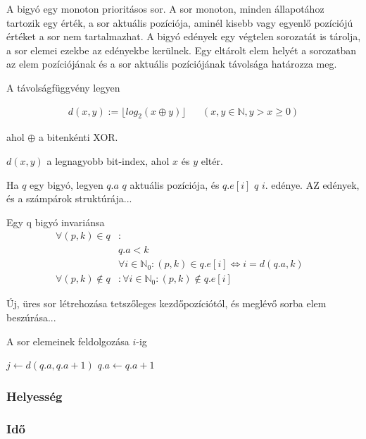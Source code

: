 A bigyó egy monoton prioritásos sor.
A sor monoton, minden állapotához tartozik egy érték, a sor aktuális pozíciója,
aminél kisebb vagy egyenlő pozíciójú értéket a sor nem tartalmazhat.
A bigyó edények egy végtelen sorozatát is tárolja, a sor elemei ezekbe az edényekbe kerülnek.
Egy eltárolt elem helyét a sorozatban az elem pozíciójának
és a sor aktuális pozíciójának távolsága határozza meg.

A távolságfüggvény legyen

\begin{align*}
d(x, y) := \lfloor log_{2}{}(x \oplus y) \rfloor & & (x, y \in \mathbb{N}, y > x \ge 0)
\end{align*}

ahol $\oplus$ a bitenkénti XOR.

$d(x, y)$ a legnagyobb bit-index, ahol $x$ és $y$ eltér.

Ha $q$ egy bigyó, legyen $q.a$ $q$ aktuális pozíciója, és $q.e[i]$ $q$ $i$. edénye. AZ edények, és a számpárok struktúrája...

Egy q bigyó invariánsa
\begin{align*}
\forall (p, k) \in q &: &\\ 
	& q.a < k\\
	& \forall i \in \mathbb{N}_{0}: (p, k) \in q.e[i] \iff i=d(q.a, k) \\
\forall (p, k) \not\in q &: \forall i \in \mathbb{N}_{0}: (p, k) \not\in q.e[i]
\end{align*}

Új, üres sor létrehozása tetszőleges kezdőpozíciótól, és meglévő sorba elem beszúrása...

A sor elemeinek feldolgozása $i$-ig
\begin{algorithmic}[1]
	\State $j \gets d(q.a, q.a + 1)$
	\State $q.a \gets q.a + 1$
		\State {}
			\State {}
		\Else
			\State {}
		\EndIf
	\EndFor
\EndWhile
\end{algorithmic}

\subsubsection{Helyesség}

\subsubsection{Idő}

